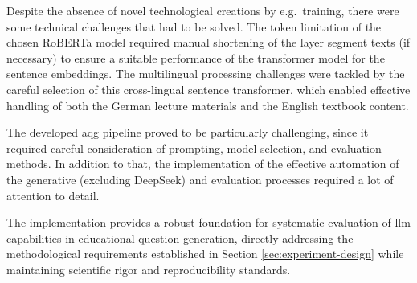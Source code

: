 Despite the absence of novel technological creations by e.g.\ training, there were some technical challenges that had to be solved. The token limitation of the chosen RoBERTa model required manual shortening of the layer segment texts (if necessary) to ensure a suitable performance of the transformer model for the sentence embeddings. The multilingual processing challenges were tackled by the careful selection of this cross-lingual sentence transformer, which enabled effective handling of both the German lecture materials and the English textbook content.

The developed \ac{aqg} pipeline proved to be particularly challenging, since it required careful consideration of prompting, model selection, and evaluation methods. In addition to that, the implementation of the effective automation of the generative (excluding DeepSeek) and evaluation processes required a lot of attention to detail. 

The implementation provides a robust foundation for systematic evaluation of \ac{llm} capabilities in educational question generation, directly addressing the methodological requirements established in Section \ref{sec:experiment-design} while maintaining scientific rigor and reproducibility standards.